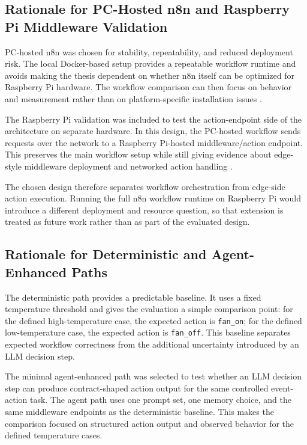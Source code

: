 \subsection{Rationale for PC-Hosted n8n and Raspberry Pi Middleware Validation}\label{subsec:rationale-pc-n8n-pi-middleware}




PC-hosted n8n was chosen for stability, repeatability, and reduced deployment risk. The local Docker-based setup provides a repeatable workflow runtime and avoids making the thesis dependent on whether n8n itself can be optimized for Raspberry Pi hardware. The workflow comparison can then focus on behavior and measurement rather than on platform-specific installation issues \cite{n8nDocs,dockerDocs}.



The Raspberry Pi validation was included to test the action-endpoint side of the architecture on separate hardware. In this design, the PC-hosted workflow sends requests over the network to a Raspberry Pi-hosted middleware/action endpoint. This preserves the main workflow setup while still giving evidence about edge-style middleware deployment and networked action handling \cite{raspberryPiDocs,edgeComputingSatyanarayanan,iotSurveyAtzori}.


The chosen design therefore separates workflow orchestration from edge-side action execution. Running the full n8n workflow runtime on Raspberry Pi would introduce a different deployment and resource question, so that extension is treated as future work rather than as part of the evaluated design.

\subsection{Rationale for Deterministic and Agent-Enhanced Paths}\label{subsec:rationale-deterministic-agent}

The deterministic path provides a predictable baseline. It uses a fixed temperature threshold and gives the evaluation a simple comparison point: for the defined high-temperature case, the expected action is \texttt{fan\_on}; for the defined low-temperature case, the expected action is \texttt{fan\_off}. This baseline separates expected workflow correctness from the additional uncertainty introduced by an LLM decision step.


The minimal agent-enhanced path was selected to test whether an LLM decision step can produce contract-shaped action output for the same controlled event-action task. The agent path uses one prompt set, one memory choice, and the same middleware endpoints as the deterministic baseline. This makes the comparison focused on structured action output and observed behavior for the defined temperature cases.



